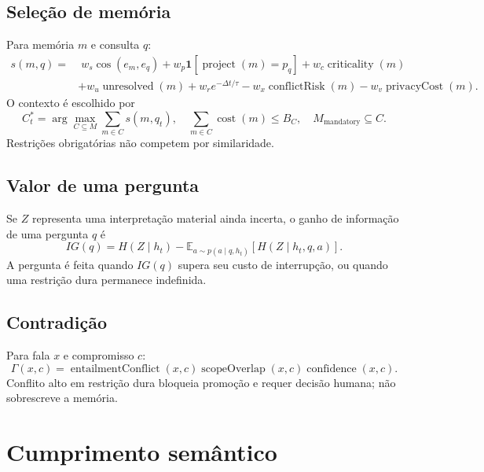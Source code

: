 \documentclass[10pt,a4paper]{article}
\begin{document}
\subsection{Seleção de memória}

Para memória $m$ e consulta $q$:
\begin{align}
s(m,q)=&\;w_s\cos(e_m,e_q)
+w_p\mathbf 1[\operatorname{project}(m)=p_q]
+w_c\operatorname{criticality}(m)\\
&+w_u\operatorname{unresolved}(m)
+w_r e^{-\Delta t/\tau}
-w_x\operatorname{conflictRisk}(m)
-w_v\operatorname{privacyCost}(m).
\end{align}
O contexto é escolhido por
\begin{equation}
C_t^*=\arg\max_{C\subseteq M}\sum_{m\in C}s(m,q_t),
\quad
\sum_{m\in C}\operatorname{cost}(m)\le B_C,
\quad M_{\mathrm{mandatory}}\subseteq C.
\end{equation}
Restrições obrigatórias não competem por similaridade.

\subsection{Valor de uma pergunta}

Se $Z$ representa uma interpretação material ainda incerta, o ganho de
informação de uma pergunta $q$ é
\begin{equation}
IG(q)=H(Z\mid h_t)-
\mathbb E_{a\sim p(a\mid q,h_t)}[H(Z\mid h_t,q,a)].
\end{equation}
A pergunta é feita quando $IG(q)$ supera seu custo de interrupção, ou quando
uma restrição dura permanece indefinida.

\subsection{Contradição}

Para fala $x$ e compromisso $c$:
\begin{equation}
\Gamma(x,c)=\operatorname{entailmentConflict}(x,c)
\operatorname{scopeOverlap}(x,c)
\operatorname{confidence}(x,c).
\end{equation}
Conflito alto em restrição dura bloqueia promoção e requer decisão humana; não
sobrescreve a memória.

\section{Cumprimento semântico}
\end{document}

